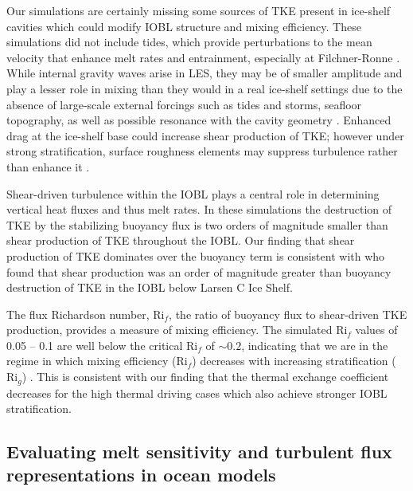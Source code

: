 \documentclass[draft]{agujournal2019}
\begin{document}
Our simulations are certainly missing some sources of TKE present in ice-shelf cavities which could modify IOBL structure and mixing efficiency. These simulations did not include tides, which provide perturbations to the mean velocity that enhance melt rates and entrainment, especially at Filchner-Ronne \cite{makinson_modeling_1999, makinson_influence_2011, mueller_tidal_2018}. While internal gravity waves arise in LES, they may be of smaller amplitude and play a lesser role in mixing than they would in a real ice-shelf settings due to the absence of large-scale external forcings such as tides and storms, seafloor topography, as well as possible resonance with the cavity geometry \cite{gwyther_cold_2020}. Enhanced drag at the ice-shelf base could increase shear production of TKE; however under strong stratification, surface roughness elements may suppress turbulence rather than enhance it \cite{ohya_wind-tunnel_2001}. 


Shear-driven turbulence within the IOBL plays a central role in determining vertical heat fluxes and thus melt rates. In these simulations the destruction of TKE by the stabilizing buoyancy flux is two orders of magnitude smaller than shear production of TKE throughout the IOBL. Our finding that shear production of TKE dominates over the buoyancy term is consistent with  who found that shear production was an order of magnitude greater than buoyancy destruction of TKE in the IOBL below Larsen C Ice Shelf. 

The flux Richardson number, $\text{Ri}_f$, the ratio of buoyancy flux to shear-driven TKE production, provides a measure of mixing efficiency. The simulated $\text{Ri}_f$ values of 0.05 -- 0.1 are well below the critical $\text{Ri}_f$ of $\sim\!0.2$, indicating that we are in the regime in which mixing efficiency ($\text{Ri}_f$) decreases with increasing stratification ($\text{Ri}_g$) \cite{armenio_investigation_2002, peltier_mixing_2003}. This is consistent with our finding that the thermal exchange coefficient decreases for the high thermal driving cases which also achieve stronger IOBL stratification.


\subsection{Evaluating melt sensitivity and turbulent flux representations in ocean models}\label{disc:prm}
\end{document}
